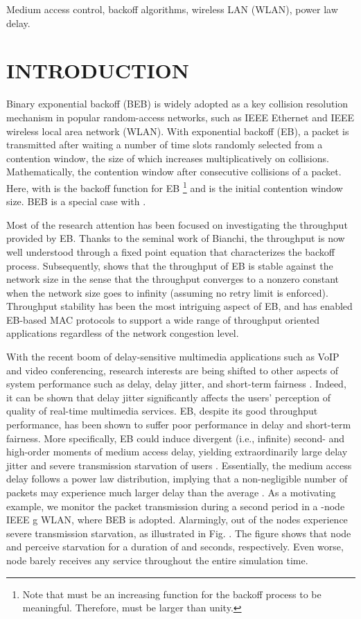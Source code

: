 \documentclass[journal]{IEEEtran}
\begin{document}
\begin{IEEEkeywords}
Medium access control, backoff algorithms, wireless LAN (WLAN), power law delay.
\end{IEEEkeywords}


\section{INTRODUCTION}
Binary exponential backoff (BEB) is widely adopted as a key collision resolution mechanism in popular random-access networks, such as IEEE  Ethernet and IEEE  wireless local area network (WLAN). With exponential backoff (EB), a packet is transmitted after waiting a number of time slots randomly selected from a contention window, the size of which increases multiplicatively on collisions. Mathematically, the contention window  after  consecutive collisions of a packet. Here,  with  is the backoff function for EB \footnote{Note that  must be an increasing function for the backoff process to be meaningful. Therefore,  must be larger than unity.} and  is the initial contention window size. BEB is a special case with .

Most of the research attention has been focused on investigating the throughput provided by EB. Thanks to the seminal work of Bianchi\cite{2000:Bianchi}, the throughput is now well understood through a fixed point equation that characterizes the backoff process. Subsequently, \cite{2005:Kwok} shows that the throughput of EB is stable against the network size in the sense that the throughput converges to a nonzero constant when the network size goes to infinity (assuming no retry limit is enforced). Throughput stability has been the most intriguing aspect of EB, and has enabled EB-based MAC protocols to support a wide range of throughput oriented applications regardless of the network congestion level.

With the recent boom of delay-sensitive multimedia applications such as VoIP and video conferencing, research interests are being shifted to other aspects of system performance such as delay, delay jitter, and short-term fairness \cite{2009:Cho}. Indeed, it can be shown that delay jitter significantly affects the users' perception of quality of real-time multimedia services. EB, despite its good throughput performance, has been shown to suffer poor performance in delay and short-term fairness. More specifically, EB could induce divergent (i.e., infinite) second- and high-order moments of medium access delay, yielding extraordinarily large delay jitter and severe transmission starvation of users \cite{2007:Sakurai,2009:Liew,2009:Cho,2010:Zhang}. Essentially, the medium access delay follows a power law distribution, implying that a non-negligible number of packets may experience much larger delay than the average \cite{2009:Liew,2007:Sakurai,2009:Cho}. As a motivating example, we monitor the packet transmission during a  second period in a -node IEEE g WLAN, where BEB is adopted. Alarmingly,  out of the  nodes experience severe transmission starvation, as illustrated in Fig. . The figure shows that node  and  perceive starvation for a duration of  and  seconds, respectively. Even worse, node  barely receives any service throughout the entire simulation time.
\end{document}
